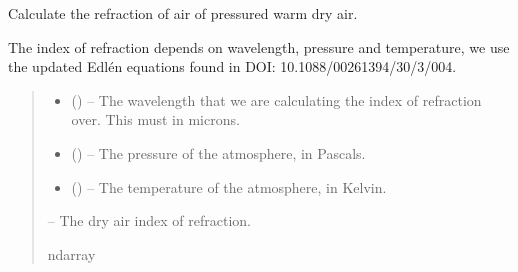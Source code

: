\documentclass[letterpaper,11pt,english]{sphinxmanual}
\begin{document}
\begin{savenotes}\begin{fulllineitems}
\label{\detokenize{code/lezargus.library.atmosphere:lezargus.library.atmosphere.index_of_refraction_dry_air}}
\pysigstartsignatures
{}
\pysigstopsignatures
\sphinxAtStartPar
Calculate the refraction of air of pressured warm dry air.

\sphinxAtStartPar
The index of refraction depends on wavelength, pressure and temperature, we
use the updated Edlén equations found in DOI: 10.1088/0026\sphinxhyphen{}1394/30/3/004.
\begin{quote}\begin{description}
\begin{itemize}
\item {} 
\sphinxAtStartPar
{} () – The wavelength that we are calculating the index of refraction over.
This must in microns.

\item {} 
\sphinxAtStartPar
{} () – The pressure of the atmosphere, in Pascals.

\item {} 
\sphinxAtStartPar
{} () – The temperature of the atmosphere, in Kelvin.

\end{itemize}

\sphinxAtStartPar
{} – The dry air index of refraction.

\sphinxAtStartPar
ndarray

\end{description}\end{quote}

\end{fulllineitems}\end{savenotes}
\end{document}
